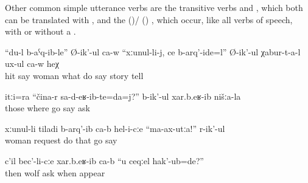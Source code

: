 Other common simple utterance verbs are the transitive verbs  and , which both can be translated with , and the   ()\slash{} () , which occur, like all verbs of speech, with or without a  .
%
\begin{exe}
	\ex	\label{ex:I hit my wife, what should I do, he says, he is telling the stories}
	\gll	``du-l	b-aˁq-ib-le''	Ø-ik'-ul	ca-w	``xːunul-li-j,	ce	b-arq'-ide=l''	Ø-ik'-ul	χabur-t-a-l	ux-ul	ca-w	heχ\\
			hit	say		woman	what	do	say	story	tell			\\
	\glt	{}

	\ex	\label{ex:They asked us, where did you come from}
	\gll	itːi=ra	``čina-r	sa-d-eʁ-ib-te=da=j?''	b-ik'-ul	xar.b.eʁ-ib	nišːa-la\\
		those	where	go	say	ask	\\
	\glt	{}

	\ex	\label{ex:‎His wife begged him, Do not go}
	\gll	xːunul-li	tiladi	b-arq'-ib	ca-b	hel-i-cːe	``ma-ax-utːa!''	r-ik'-ul\\
		woman	request	do		that	go	say\\
	\glt	{}
	
	\ex	\label{ex:‎‎Then they asked the wolf, When were you born?}
	\gll	c'il	bec'-li-cːe	xar.b.eʁ-ib	ca-b	``u	ceqːel	hak'-ub=de?''\\
		then	wolf	ask			when	appear\\
	\glt	{}
	
\end{exe}

